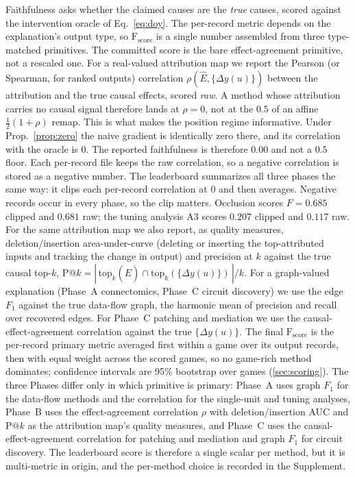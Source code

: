 Faithfulness asks whether the claimed causes are the \emph{true} causes, scored against the
intervention oracle of Eq.~\eqref{eq:doy}. The per-record metric depends on the explanation's
output type, so $\mathrm{F}_{\mathrm{score}}$ is a single number assembled from three
type-matched primitives. The committed score is the bare effect-agreement primitive, not a
rescaled one. For a real-valued attribution map we report the Pearson (or Spearman, for ranked
outputs) correlation $\rho(\hat{E},\{\Delta y(u)\})$ between the attribution and the true causal
effects, scored \emph{raw}. A method whose attribution carries no causal signal therefore lands
at $\rho=0$, not at the $0.5$ of an affine $\tfrac{1}{2}(1+\rho)$ remap. This is what makes
the position regime informative. Under Prop.~\ref{prop:zero} the naive gradient is identically
zero there, and its correlation with the oracle is $0$. The reported faithfulness is therefore
$0.00$ and not a $0.5$ floor. Each per-record file keeps the raw correlation, so a negative
correlation is stored as a negative number. The leaderboard summarizes all three phases the
same way: it clips each per-record correlation at $0$ and then averages. Negative records
occur in every phase, so the clip matters. Occlusion scores $F=0.685$ clipped and $0.681$
raw; the tuning analysis A3 scores $0.207$ clipped and $0.117$ raw. For the same attribution
map we also report, as quality measures,
deletion/insertion area-under-curve (deleting or inserting the top-attributed inputs and
tracking the change in output) and precision at $k$ against the true causal top-$k$,
$\mathrm{P@}k=|\,\mathrm{top}_k(\hat{E})\cap\mathrm{top}_k(\{\Delta y(u)\})\,|/k$. For a
graph-valued explanation (Phase~A connectomics, Phase~C circuit discovery) we use the edge
$F_1$ against the true data-flow graph, the harmonic mean of precision and recall over recovered
edges. For Phase~C patching and mediation we use the causal-effect-agreement correlation against
the true $\{\Delta y(u)\}$. The final $\mathrm{F}_{\mathrm{score}}$ is the per-record primary
metric averaged first within a game over its output records, then with equal weight across the
scored games, so no game-rich method dominates; confidence intervals are 95\% bootstrap over
games (\Sectionname\ref{sec:scoring}). The three Phases differ only in which primitive is primary: Phase~A
uses graph $F_1$ for the data-flow methods and the correlation for the
single-unit and tuning analyses, Phase~B uses the effect-agreement correlation $\rho$ with
deletion/insertion AUC and $\mathrm{P@}k$ as the attribution map's quality measures, and Phase~C
uses the causal-effect-agreement correlation for patching and mediation and graph $F_1$ for
circuit discovery. The leaderboard score is therefore a single scalar per method, but it is
multi-metric in origin, and the per-method choice is recorded in the Supplement.


